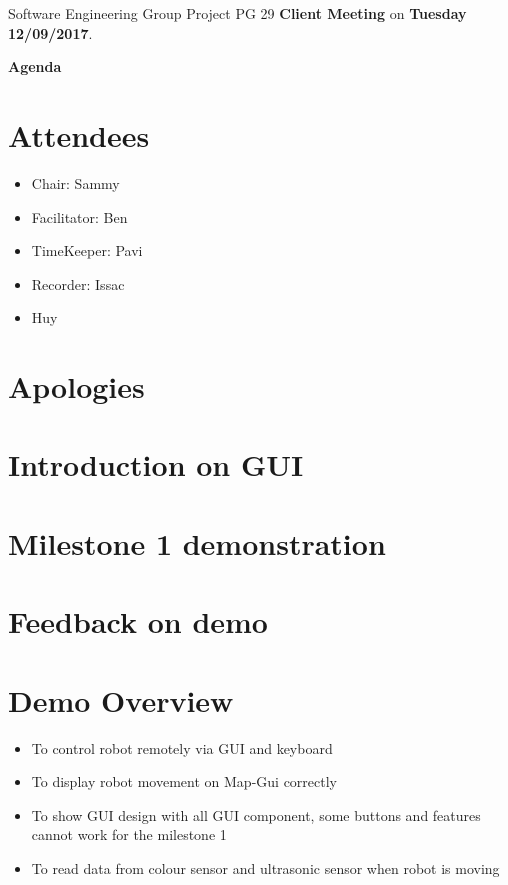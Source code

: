 \documentclass[11pt, a4paper]{article}
\begin{document}
\noindent Software Engineering Group Project PG 29 {\bf Client Meeting} on {\bf Tuesday 12/09/2017}.
\vspace*{10pt}
\begin{center}
\huge \bf Agenda
\end{center}

\section{Attendees}
\begin{itemize}
\item Chair: Sammy
\item Facilitator: Ben
\item TimeKeeper: Pavi 
\item Recorder: Issac
\item Huy
\end{itemize}

\section{Apologies}

\section{Introduction on GUI}


\section{Milestone 1 demonstration}

\section{Feedback on demo} 

\section{Demo Overview}
\begin{itemize}
	\item To control robot remotely via GUI and keyboard
	\item To display robot movement on Map-Gui correctly
	\item To show GUI design with all GUI component, some buttons and features cannot work for the milestone 1
	\item To read data from colour sensor and ultrasonic sensor when robot is moving
\end{itemize}
\end{document}
